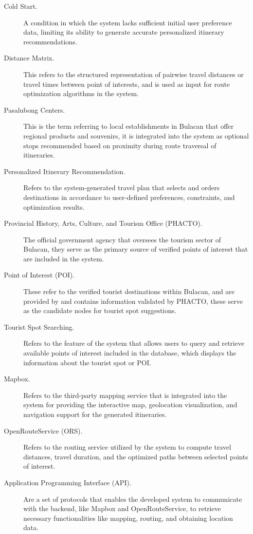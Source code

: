 \begin{description}
	\item[Cold Start.]
	A condition in which the system lacks sufficient initial user preference data,
	limiting its ability to generate accurate personalized itinerary recommendations.
	
	\item[Distance Matrix.]
	This refers to the structured representation of pairwise travel distances or travel times between point of interests, and is used as input for route optimization algorithms in the system.
	
	\item[Pasalubong Centers.]
	This is the term referring to local establishments in Bulacan that offer regional products and souvenirs, it is integrated into the system as optional stops recommended based on proximity during route traversal of itineraries.
	
	\item[Personalized Itinerary Recommendation.]
	Refers to the system-generated travel plan that selects and orders destinations in accordance to user-defined preferences, constraints, and optimization results.
	
	\item[Provincial History, Arts, Culture, and Tourism Office (PHACTO).]The official government agency that oversees the tourism sector of Bulacan, they serve as the primary source of verified points of interest that are included in the system.
	
	\item[Point of Interest (POI).]
	These refer to the verified tourist destinations within Bulacan, and are provided by and contains information validated by PHACTO, these serve as the candidate nodes for tourist spot suggestions.
	
	\item[Tourist Spot Searching.]
	Refers to the feature of the system that allows users to query and retrieve available points of interest included in the database, which displays the information about the tourist spot or POI.
	
	\item[Mapbox.]
	Refers to the third-party mapping service that is integrated into the system for providing the interactive map, geolocation visualization, and navigation support for the generated itineraries.
	
	\item[OpenRouteService (ORS).]
	Refers to the routing service utilized by the system to compute travel
	distances, travel duration, and the optimized paths between selected points of interest.
	
	\item[Application Programming Interface (API).]
	Are a set of protocols that enables the developed system to communicate with the backend, like Mapbox and OpenRouteService, to retrieve necessary functionalities like mapping, routing, and obtaining location data.
	
\end{description}
